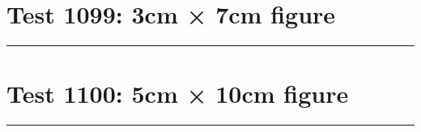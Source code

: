 \documentclass[a4paper,11pt]{article}
\begin{document}
\section*{Test 1099: 3cm × 7cm figure}
\begin{swarmwrap}%
  \begin{minipage}[t]{3cm}
    \centering
    \rule{\linewidth}{7cm}
  \end{minipage}%
\end{swarmwrap}%
\swarmwrapnext
\lipsum[57]
\lipsum[58]
\lipsum[59]
\lipsum[60]
\lipsum[61]
\section*{Test 1100: 5cm × 10cm figure}
\begin{swarmwrap}%
  \begin{minipage}[t]{5cm}
    \centering
    \rule{\linewidth}{10cm}
  \end{minipage}%
\end{swarmwrap}%
\swarmwrapnext
\lipsum[145]
\lipsum[146]
\lipsum[147]
\lipsum[148]
\lipsum[149]
\lipsum[150]
\end{document}
